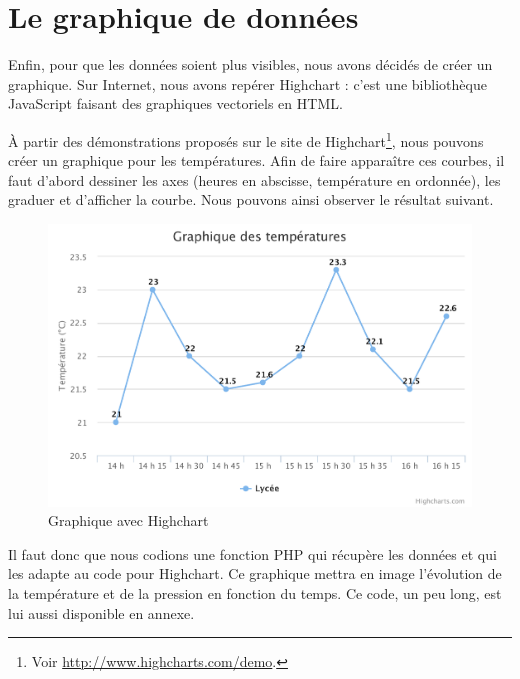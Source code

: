 \section{Le graphique de données}

Enfin, pour que les données soient plus visibles, nous avons décidés de créer un graphique. Sur Internet, nous avons repérer Highchart : c'est une bibliothèque JavaScript faisant des graphiques vectoriels en HTML.

À partir des démonstrations proposés sur le site de Highchart\footnote{Voir \url{http://www.highcharts.com/demo}.}, nous pouvons créer un graphique pour les températures. Afin de faire apparaître ces courbes, il faut d'abord dessiner les axes (heures en abscisse, température en ordonnée), les graduer et d'afficher la courbe.
Nous pouvons ainsi observer le résultat suivant.

\begin{figure}[!h]
	\centering
	\includegraphics[width=.6\linewidth]{Images/Exemple_graphique}
	\caption{Graphique avec Highchart}
\end{figure}

Il faut donc que nous codions une fonction PHP qui récupère les données et qui les adapte au code pour Highchart. Ce graphique mettra en image l'évolution de la température et de la pression en fonction du temps. Ce code, un peu long, est lui aussi disponible en annexe.
